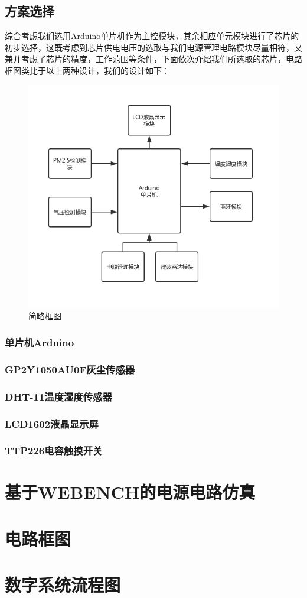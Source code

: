 \documentclass[12pt]{ctexart}
\begin{document}
\subsection{方案选择}
\par{} 综合考虑我们选用Arduino单片机作为主控模块，其余相应单元模块进行了芯片的初步选择，这既考虑到芯片供电电压的选取与我们电源管理电路模块尽量相符，又兼并考虑了芯片的精度，工作范围等条件，下面依次介绍我们所选取的芯片，电路框图类比于以上两种设计，我们的设计如下：
\begin{figure}[H]
  \centering
  \includegraphics[scale = 0.45 ]{1-n.png}
  \caption{简略框图}
  \label{img6} 
\end{figure}
\subsubsection{单片机Arduino}

\subsubsection{GP2Y1050AU0F灰尘传感器}

\subsubsection{DHT-11温度湿度传感器}

\subsubsection{LCD1602液晶显示屏}

\subsubsection{TTP226电容触摸开关}


\section{基于WEBENCH的电源电路仿真}
\section{电路框图}

\section{数字系统流程图}




\end{document}

